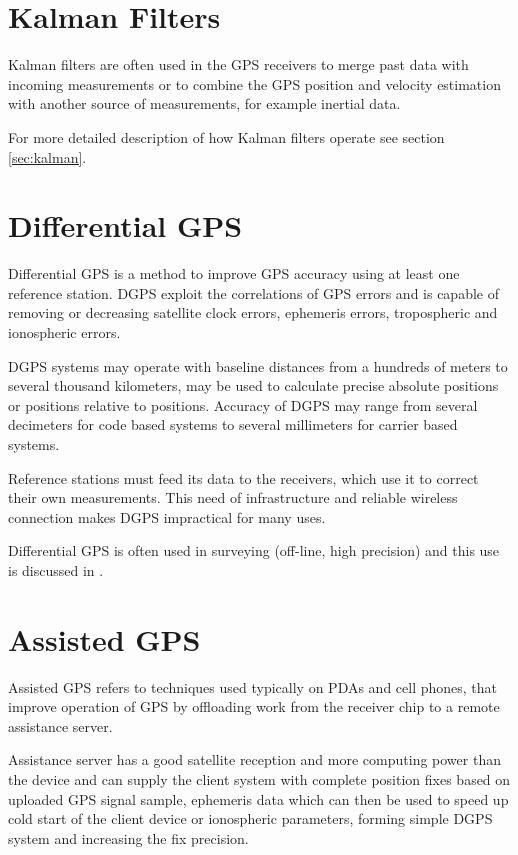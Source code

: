 \section{Kalman Filters}
Kalman filters are often used in the GPS receivers to merge past
data with incoming measurements or to combine the GPS position and velocity
estimation with another source of measurements, for example inertial data.

For more detailed description of how Kalman filters operate see section
\ref{sec:kalman}.

\section{Differential GPS}
\label{sec:dgps}

Differential GPS is a method to improve GPS accuracy using at least one reference station.
DGPS exploit the correlations of GPS errors and is capable of removing or decreasing satellite clock errors,
ephemeris errors, tropospheric and ionospheric errors.

DGPS systems may operate with baseline distances from a hundreds of meters to several thousand kilometers,
may be used to calculate precise absolute positions or positions relative to positions.
Accuracy of DGPS may range from several decimeters for code based systems to several
millimeters for carrier based systems.

Reference stations must feed its data to the receivers, which use it to correct their own measurements.
This need of infrastructure and reliable wireless connection makes DGPS impractical for many uses.


Differential GPS is often used in surveying (off-line, high precision) and this
use is discussed in \cite{rizos99}.

\section{Assisted GPS}
Assisted GPS refers to techniques used typically on PDAs and cell phones, that improve operation of GPS by offloading
work from the receiver chip to a remote assistance server.

Assistance server has a good satellite reception and more computing power than the device
and can supply the client system with complete position fixes based on uploaded GPS signal sample,
ephemeris data which can then be used to speed up cold start of the client device or
ionospheric parameters, forming simple DGPS system and increasing the fix precision.

